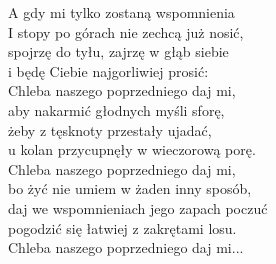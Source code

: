
\begin{flushleft}
A gdy mi tylko zostaną wspomnienia \tab{} \\
I stopy po górach nie zechcą już nosić, \tab{} \\
spojrzę do tyłu, zajrzę w głąb siebie \tab{} \\
i będę Ciebie najgorliwiej prosić: \tab{} \\
\vskip 3mm
Chleba naszego poprzedniego daj mi, \tab{} \\
aby nakarmić głodnych myśli sforę, \tab{} \\
żeby z tęsknoty przestały ujadać, \tab{} \\
u kolan przycupnęły w wieczorową porę. \tab{} \\
\vskip 3mm
Chleba naszego poprzedniego daj mi,  \\
bo żyć nie umiem w żaden inny sposób,  \\
daj we wspomnieniach jego zapach poczuć  \\
pogodzić się łatwiej z zakrętami losu.  \\
\vskip 3mm
Chleba naszego poprzedniego daj mi... \\
\end{flushleft}
\clearpage
